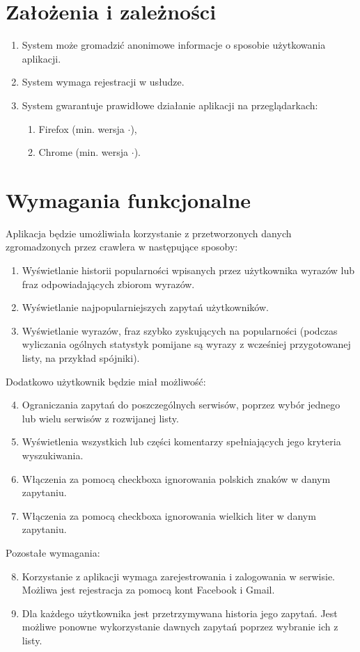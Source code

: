\documentclass[a4paper]{scrreprt}
\begin{document}
\section*{Założenia i zależności}
\begin{enumerate}
	\itemsep-0.1cm
	\item System może gromadzić anonimowe informacje o sposobie użytkowania aplikacji.
    \item System wymaga rejestracji w usłudze.
    \item System gwarantuje prawidłowe działanie aplikacji na przeglądarkach:
        \begin{enumerate}[label=\textbullet]
	        \itemsep-0.1cm
	        \item Firefox (min. wersja $\cdot$),
	        \item Chrome (min. wersja $\cdot$).
        \end{enumerate}
\end{enumerate}

\section*{Wymagania funkcjonalne}
Aplikacja będzie umożliwiała korzystanie z przetworzonych danych zgromadzonych przez crawlera w następujące sposoby:
\begin{enumerate}
	\itemsep-0.1cm
	\item Wyświetlanie historii popularności wpisanych przez użytkownika wyrazów lub  fraz odpowiadających zbiorom wyrazów.
	\item Wyświetlanie najpopularniejszych zapytań użytkowników.
	\item Wyświetlanie wyrazów, fraz szybko zyskujących na popularności (podczas wyliczania ogólnych statystyk pomijane są wyrazy z wcześniej przygotowanej listy, na przykład spójniki). %
\end{enumerate}
Dodatkowo użytkownik będzie miał możliwość:	
\begin{enumerate}
	\setcounter{enumi}{3}
	\itemsep-0.1cm
	\item Ograniczania zapytań do poszczególnych serwisów, poprzez wybór jednego lub wielu serwisów z rozwijanej listy.
	\item Wyświetlenia wszystkich lub części komentarzy spełniających jego kryteria wyszukiwania.
    \item Włączenia za pomocą checkboxa ignorowania polskich znaków w danym zapytaniu.
    \item Włączenia za pomocą checkboxa ignorowania wielkich liter w danym zapytaniu.
\end{enumerate}
Pozostałe wymagania:
\begin{enumerate}
	\setcounter{enumi}{7}
	\itemsep-0.1cm
	\item Korzystanie z aplikacji  wymaga zarejestrowania i zalogowania w serwisie.  Możliwa jest rejestracja za pomocą kont Facebook i Gmail.
	\item Dla każdego użytkownika jest przetrzymywana historia jego zapytań. Jest możliwe ponowne wykorzystanie dawnych zapytań poprzez wybranie ich z listy.
\end{enumerate}
\end{document}
